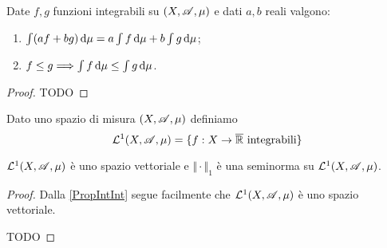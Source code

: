 \begin{proposition}\label{PropIntInt}
	Date $f,g$ funzioni integrabili su $(X,\mathscr A,\mu)$ e dati $a,b$ reali valgono:
	\begin{enumerate}
		\item $\int (af+bg)\,\mathrm d\mu=a\int f\,\mathrm d\mu+b\int g\,\mathrm d\mu$;\label{PII:add}
		\item $f\le g\Longrightarrow \int f\,\mathrm d\mu\le \int g\,\mathrm d\mu$.\label{PII:mono}
	\end{enumerate}
\end{proposition}
\begin{proof}
	TODO
\end{proof}



\begin{definition}
	Dato uno spazio di misura $(X,\mathscr A,\mu)$ definiamo
	\begin{equation*}
		\mathcal L^1(X,\mathscr A,\mu)=\{ f:X\to\overline{\mathbb R} \text{ integrabili} \}
	\end{equation*}
\end{definition}

\begin{proposition}
	$\mathcal L^1(X,\mathscr A,\mu)$ è uno spazio vettoriale e $\Vert \cdot \Vert_1$ è una seminorma su $\mathcal L^1(X,\mathscr A,\mu)$.
\end{proposition}
\begin{proof}
	Dalla \cref{PropIntInt} segue facilmente che $\mathcal L^1(X,\mathscr A,\mu)$ è uno spazio vettoriale.
	
	TODO
\end{proof}













